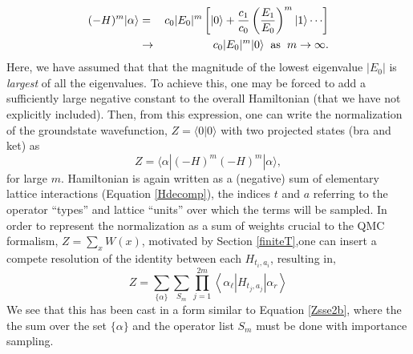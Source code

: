 \documentclass[vecphys]{svmult}
\begin{document}
\begin{eqnarray}
(-H)^m |\alpha \rangle &=& c_0|E_0|^m \left[{  |0 \rangle + \frac{c_1}{c_0} \left({ \frac{E_1}{E_0} }\right)^m|1 \rangle \cdots  }\right] \\
&\rightarrow& c_0|E_0|^m |0 \rangle \hspace{2mm} {\rm as} \hspace{2mm} m \rightarrow \infty. \nonumber
\end{eqnarray}
Here, we have assumed that that the magnitude of the lowest eigenvalue $|E_0|$ is {\it largest} of all the eigenvalues.  To achieve this, one may be forced to add a sufficiently large negative constant to the overall Hamiltonian (that we have not explicitly included).
Then, from this expression, one can write the normalization of the groundstate wavefunction, $Z=\langle 0 | 0 \rangle$ with two projected states (bra and ket) as
\begin{equation}
Z = \langle \alpha | (-H)^m (-H)^m | \alpha \rangle, \label{normZ2}
\end{equation}
for large $m$.  
Hamiltonian is again written as a (negative) sum of elementary lattice interactions (Equation \ref{Hdecomp}), the indices $t$ and $a$ referring to the operator ``types'' and lattice ``units'' over which the terms will be sampled.  
In order to represent the normalization as a sum of weights crucial to the QMC formalism, $Z = \sum_x W(x)$, motivated by Section \ref{finiteT},one can insert a compete resolution of the identity between each $H_{t_i,a_i}$, resulting in,
\begin{equation}
Z=\sum_{ \{ \alpha\} } \sum_{S_m} 
\prod_{j=1}^{2m}   \left\langle{\alpha_{\ell}  \left| H_{t_j,a_j}\right| \alpha_r  }\right\rangle
 \label{Zproj2b}
\end{equation}
We see that this has been cast in a form similar to Equation \ref{Zsse2b}, where the  the sum over the set $\{ \alpha \}$ and the operator list $S_m$ must be done with importance sampling. 
\end{document}
